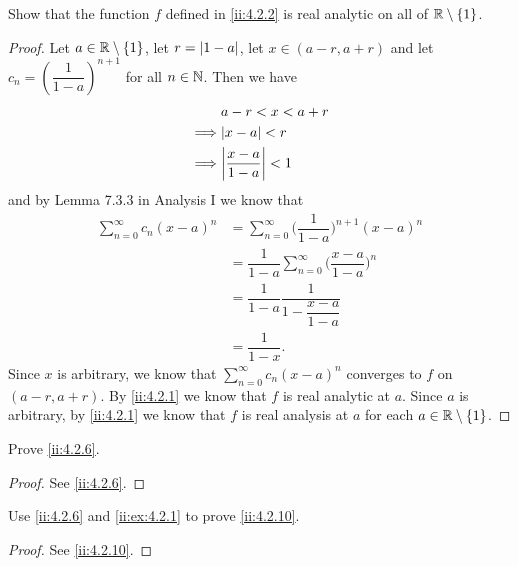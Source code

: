 \begin{ex}\label{ii:ex:4.2.2}
  Show that the function \(f\) defined in \cref{ii:4.2.2} is real analytic on all of \(\mathbb{R} \setminus \left\lbrace1\right\rbrace\).
\end{ex}

\begin{proof}
  Let \(a \in \mathbb{R} \setminus \left\lbrace1\right\rbrace\), let \(r = \left\lvert1 - a\right\rvert\), let \(x \in (a - r, a + r)\) and let \(c_n = (\dfrac{1}{1 - a})^{n + 1}\) for all \(n \in \mathbb{N}\).
  Then we have
  \begin{align*}
             & a - r < x < a + r              \\
    \implies & \abs{x - a} < r                \\
    \implies & \abs{\dfrac{x - a}{1 - a}} < 1
  \end{align*}
  and by Lemma 7.3.3 in Analysis I we know that
  \begin{align*}
    \sum_{n = 0}^\infty c_n (x - a)^n & = \sum_{n = 0}^\infty \bigg(\dfrac{1}{1 - a}\bigg)^{n + 1} (x - a)^n      \\
                                      & = \dfrac{1}{1 - a} \sum_{n = 0}^\infty \bigg(\dfrac{x - a}{1 - a}\bigg)^n \\
                                      & = \dfrac{1}{1 - a} \dfrac{1}{1 - \dfrac{x - a}{1 - a}}                    \\
                                      & = \dfrac{1}{1 - x}.
  \end{align*}
  Since \(x\) is arbitrary, we know that \(\sum_{n = 0}^\infty c_n (x - a)^n\) converges to \(f\) on \((a - r, a + r)\).
  By \cref{ii:4.2.1} we know that \(f\) is real analytic at \(a\).
  Since \(a\) is arbitrary, by \cref{ii:4.2.1} we know that \(f\) is real analysis at \(a\) for each \(a \in \mathbb{R} \setminus \left\lbrace1\right\rbrace\).
\end{proof}

\begin{ex}\label{ii:ex:4.2.3}
  Prove \cref{ii:4.2.6}.
\end{ex}

\begin{proof}
  See \cref{ii:4.2.6}.
\end{proof}

\begin{ex}\label{ii:ex:4.2.4}
  Use \cref{ii:4.2.6} and \cref{ii:ex:4.2.1} to prove \cref{ii:4.2.10}.
\end{ex}

\begin{proof}
  See \cref{ii:4.2.10}.
\end{proof}

